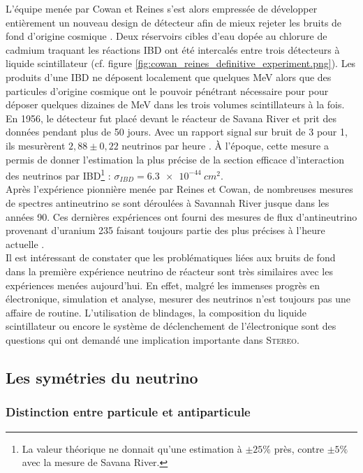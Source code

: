 L'équipe menée par Cowan et Reines s'est alors empressée de développer entièrement un nouveau design de détecteur afin de mieux rejeter les bruits de fond d'origine cosmique \cite{Cowan:1992xc}. Deux réservoirs cibles d'eau dopée au chlorure de cadmium traquant les réactions IBD ont été intercalés entre trois détecteurs à liquide scintillateur (cf. figure \ref{fig:cowan_reines_definitive_experiment.png}). Les produits d'une IBD ne déposent localement que quelques MeV alors que des particules d'origine cosmique ont le pouvoir pénétrant nécessaire pour pour déposer quelques dizaines de MeV dans les trois volumes scintillateurs à la fois. En 1956, le détecteur fut placé devant le réacteur de Savana River et prit des données pendant plus de 50 jours. Avec un rapport signal sur bruit de 3 pour 1, ils mesurèrent $2,88 \pm 0,22$ neutrinos par heure \cite{Reines:1956rs}. À l'époque, cette mesure a permis de donner l'estimation la plus précise de la section efficace d'interaction des neutrinos par IBD\footnote{La valeur théorique ne donnait qu'une estimation à $\pm 25 \%$ près, contre $\pm 5 \%$ avec la mesure de Savana River.} : $\sigma_{IBD} = \SI{6.3e-44}{cm^2}$.\\

Après l'expérience pionnière menée par Reines et Cowan, de nombreuses mesures de spectres antineutrino se sont déroulées à Savannah River jusque dans les années 90. Ces dernières expériences ont fourni des mesures de flux d'antineutrino provenant d'uranium 235 faisant toujours partie des plus précises à l'heure actuelle \cite{Greenwood:1996pb}.\\

Il est intéressant de constater que les problématiques liées aux bruits de fond dans la première expérience neutrino de réacteur sont très similaires avec les expériences menées aujourd'hui. En effet, malgré les immenses progrès en électronique, simulation et analyse, mesurer des neutrinos n'est toujours pas une affaire de routine. L'utilisation de blindages, la composition du liquide scintillateur ou encore le système de déclenchement de l'électronique sont des questions qui ont demandé une implication importante dans \textsc{Stereo}.

\bigbreak

\subsection{Les symétries du neutrino}

\subsubsection*{Distinction entre particule et antiparticule}

